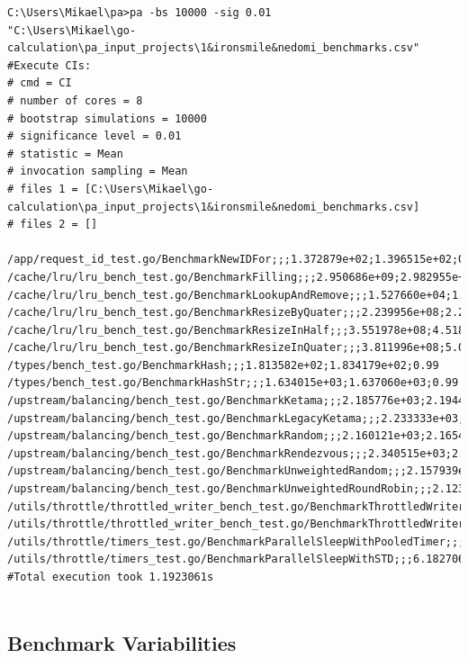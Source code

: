 \documentclass{seal_thesis}
\begin{document}
\begin{lstlisting}[caption=Example pa-tool results of \cite{ironsmile/nedomi}., label={lst:patool}, frame=single, breaklines=true, basicstyle=\small]
C:\Users\Mikael\pa>pa -bs 10000 -sig 0.01
"C:\Users\Mikael\go-calculation\pa_input_projects\1&ironsmile&nedomi_benchmarks.csv"
#Execute CIs:
# cmd = CI
# number of cores = 8
# bootstrap simulations = 10000
# significance level = 0.01
# statistic = Mean
# invocation sampling = Mean
# files 1 = [C:\Users\Mikael\go-calculation\pa_input_projects\1&ironsmile&nedomi_benchmarks.csv]
# files 2 = []

/app/request_id_test.go/BenchmarkNewIDFor;;;1.372879e+02;1.396515e+02;0.99
/cache/lru/lru_bench_test.go/BenchmarkFilling;;;2.950686e+09;2.982955e+09;0.99
/cache/lru/lru_bench_test.go/BenchmarkLookupAndRemove;;;1.527660e+04;1.532752e+04;0.99
/cache/lru/lru_bench_test.go/BenchmarkResizeByQuater;;;2.239956e+08;2.292164e+08;0.99
/cache/lru/lru_bench_test.go/BenchmarkResizeInHalf;;;3.551978e+08;4.518111e+08;0.99
/cache/lru/lru_bench_test.go/BenchmarkResizeInQuater;;;3.811996e+08;5.008146e+08;0.99
/types/bench_test.go/BenchmarkHash;;;1.813582e+02;1.834179e+02;0.99
/types/bench_test.go/BenchmarkHashStr;;;1.634015e+03;1.637060e+03;0.99
/upstream/balancing/bench_test.go/BenchmarkKetama;;;2.185776e+03;2.194403e+03;0.99
/upstream/balancing/bench_test.go/BenchmarkLegacyKetama;;;2.233333e+03;2.242545e+03;0.99
/upstream/balancing/bench_test.go/BenchmarkRandom;;;2.160121e+03;2.165439e+03;0.99
/upstream/balancing/bench_test.go/BenchmarkRendezvous;;;2.340515e+03;2.347833e+03;0.99
/upstream/balancing/bench_test.go/BenchmarkUnweightedRandom;;;2.157939e+03;2.164152e+03;0.99
/upstream/balancing/bench_test.go/BenchmarkUnweightedRoundRobin;;;2.123652e+03;2.130727e+03;0.99
/utils/throttle/throttled_writer_bench_test.go/BenchmarkThrottledWriter;;;4.030817e+09;4.036552e+09;0.99
/utils/throttle/throttled_writer_bench_test.go/BenchmarkThrottledWriterWithReadFrom;;;4.038926e+09;4.040731e+09;0.99
/utils/throttle/timers_test.go/BenchmarkParallelSleepWithPooledTimer;;;6.253588e+07;6.261951e+07;0.99
/utils/throttle/timers_test.go/BenchmarkParallelSleepWithSTD;;;6.182706e+07;6.191619e+07;0.99
#Total execution took 1.1923061s
	
\end{lstlisting}


\subsection{Benchmark Variabilities}
\label{Benchmark Variabilities}
\end{document}
